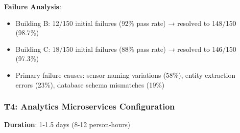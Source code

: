 \documentclass[acmlarge]{acmart}
\begin{document}
\textbf{Failure Analysis}:
\begin{itemize}
    \item Building B: 12/150 initial failures (92\% pass rate) → resolved to 148/150 (98.7\%)
    \item Building C: 18/150 initial failures (88\% pass rate) → resolved to 146/150 (97.3\%)
    \item Primary failure causes: sensor naming variations (58\%), entity extraction errors (23\%), database schema mismatches (19\%)
\end{itemize}

\subsubsection{T4: Analytics Microservices Configuration}

\textbf{Duration}: 1-1.5 days (8-12 person-hours)
\end{document}
